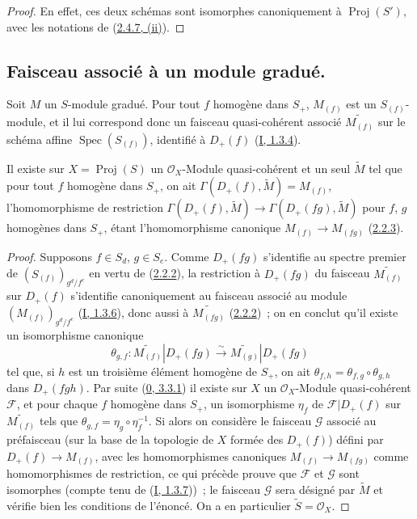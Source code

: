 \begin{proof}
En effet, ces deux schémas sont isomorphes canoniquement à
$\operatorname{Proj}(S')$, avec les notations de
(\hyperref[II.2.4.7-fr]{2.4.7, (ii)}).
\end{proof}

\subsection{Faisceau associé à un module gradué.}
\label{subsection:II.2.5-fr}

\begin{env}[2.5.1]
\label{II.2.5.1-fr}
Soit $M$ un $S$-module gradué. Pour tout $f$ homogène dans $S_+$,
$M_{(f)}$ est un $S_{(f)}$-module, et il lui correspond donc un faisceau
quasi-cohérent associé $\widetilde{M_{(f)}}$ sur le schéma affine
$\operatorname{Spec}(S_{(f)})$, identifié à $D_+(f)$
(\hyperref[I.1.3.4-fr]{I, 1.3.4}).
\end{env}

\begin{proposition}[2.5.2]
\label{II.2.5.2-fr}
Il existe sur $X=\operatorname{Proj}(S)$ un $\mathcal{O}_X$-Module
quasi-cohérent et un seul $\widetilde{M}$ tel que pour tout $f$ homogène
dans $S_+$, on ait
$\Gamma(D_+(f),\widetilde{M})=M_{(f)}$, l'homomorphisme de restriction
$\Gamma(D_+(f),\widetilde{M})\to
\Gamma(D_+(fg),\widetilde{M})$ pour $f$, $g$ homogènes dans $S_+$, étant
l'homomorphisme canonique $M_{(f)}\to M_{(fg)}$
(\hyperref[II.2.2.3-fr]{2.2.3}).
\end{proposition}

\begin{proof}
Supposons $f\in S_d$, $g\in S_e$. Comme $D_+(fg)$ s'identifie au spectre
premier de $(S_{(f)})_{g^d/f^e}$ en vertu de
(\hyperref[II.2.2.2-fr]{2.2.2}), la restriction à $D_+(fg)$ du faisceau
$\widetilde{M_{(f)}}$ sur $D_+(f)$ s'identifie canoniquement au faisceau
associé au module $(M_{(f)})_{g^d/f^e}$
(\hyperref[I.1.3.6-fr]{I, 1.3.6}), donc aussi à
$\widetilde{M_{(fg)}}$ (\hyperref[II.2.2.2-fr]{2.2.2})~; on en conclut
qu'il existe un isomorphisme canonique
\[
  \theta_{g,f}:\widetilde{M_{(f)}}|D_+(fg)
  \xrightarrow{\sim}\widetilde{M_{(g)}}|D_+(fg)
\]
tel que, si $h$ est un troisième élément homogène de $S_+$, on ait
$\theta_{f,h}=\theta_{f,g}\circ\theta_{g,h}$ dans $D_+(fgh)$. Par suite
(\hyperref[0.3.3.1-fr]{0, 3.3.1}) il existe sur $X$ un
$\mathcal{O}_X$-Module quasi-cohérent $\mathcal{F}$, et pour chaque $f$
homogène dans $S_+$, un isomorphisme $\eta_f$ de
$\mathcal{F}|D_+(f)$ sur $\widetilde{M_{(f)}}$ tels que
$\theta_{g,f}=\eta_g\circ\eta_f^{-1}$. Si alors on considère le faisceau
$\mathcal{G}$ associé au préfaisceau (sur la base de la topologie de $X$
formée des $D_+(f)$) défini par $D_+(f)\to M_{(f)}$, avec les
homomorphismes canoniques $M_{(f)}\to M_{(fg)}$ comme homomorphismes de
restriction, ce qui précède prouve que $\mathcal{F}$ et $\mathcal{G}$ sont
isomorphes (compte tenu de (\hyperref[I.1.3.7-fr]{I, 1.3.7}))~; le
faisceau $\mathcal{G}$ sera désigné par $\widetilde{M}$ et vérifie bien les
conditions de l'énoncé. On a en particulier
$\widetilde{S}=\mathcal{O}_X$.
\end{proof}

